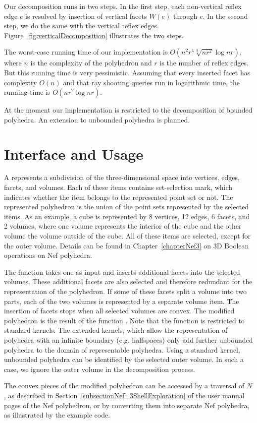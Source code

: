 Our decomposition runs in two steps. In the first step, each
non-vertical reflex edge $e$ is resolved by insertion of vertical
facets $W(e)$ through $e$. In the second step, we do the same with the
vertical reflex edges. Figure~\ref{fig:verticalDecomposition}
illustrates the two steps.

The worst-case running time of our implementation is
$O(n^2r^4\sqrt[3]{nr^2}\log{nr})$, where $n$ is the complexity of the
polyhedron and $r$ is the number of reflex edges. But this running
time is very pessimistic. Assuming that every inserted facet has
complexity $O(n)$ and that ray shooting queries run in logarithmic
time, the running time is $O(nr^2\log{nr})$.

At the moment our implementation is restricted to the decomposition of
bounded polyhedra. An extension to unbounded polyhedra is planned.

\section{Interface and Usage}

A  represents a subdivision of the
three-dimensional space into vertices, edges, facets, and
volumes. Each of these items contains set-selection mark, which
indicates whether the item belongs to the represented point set or
not. The represented polyhedron is the union of the point sets
represented by the selected items. As an example, a cube is
represented by 8 vertices, 12 edges, 6 facets, and 2 volumes, where
one volume represents the interior of the cube and the other volume the
volume outside of the cube. All of these items are selected, except
for the outer volume.  Details can be found in Chapter~\ref{chapterNef3} 
on 3D Boolean operations on Nef polyhedra.

The function  takes one
 as input and inserts additional facets into the
selected volumes. These additional facets are also selected and
therefore redundant for the representation of the polyhedron. If some
of these facets split a volume into two parts, each of the two volumes
is represented by a separate volume item. The insertion of facets
stops when all selected volumes are convex. The modified
polyhedron is the result of the function
. Note that the function 
 is restricted to standard kernels. 
The extended kernels, which allow the representation of polyhedra with
an infinite boundary (e.g. halfspaces) only add further unbounded
polyhedra to the domain of representable polyhedra. Using a standard
kernel, unbounded polyhedra can be identified by the selected outer
volume. In such a case, we ignore the outer volume in the
decomposition process.

The convex pieces of the modified polyhedron can be accessed by
a traversal of $N$, as described in Section~\ref{subsectionNef_3ShellExploration} of the
user manual pages of the Nef polyhedron, or by converting
them into separate Nef polyhedra, as illustrated by the example code.

